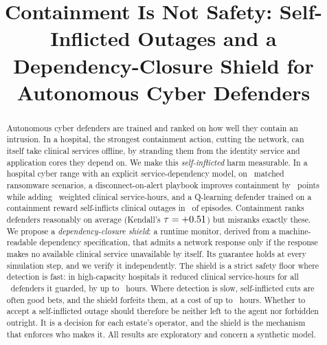 \documentclass[conference,compsoc]{IEEEtran}
\begin{document}
\title{Containment Is Not Safety: Self-Inflicted Outages and a\\
Dependency-Closure Shield for Autonomous Cyber Defenders}

\author{
}

\maketitle

\begin{abstract}
Autonomous cyber defenders are trained and ranked on how well they contain
an intrusion. In a hospital, the strongest containment action, cutting the
network, can itself take clinical services offline, by stranding them from
the identity service and application cores they depend on. We make this
\emph{self-inflicted} harm measurable. In a hospital cyber range with an
explicit service-dependency model, on \numEvalScenarios\ matched ransomware
scenarios, a disconnect-on-alert playbook improves containment by
\numVsDisconnectSpreadAbs\ points while adding \numVsDisconnectHoursAbs\
weighted clinical service-hours, and a Q-learning defender trained on a
containment reward self-inflicts clinical outages in
\numQContainmentTodaySelfPct\ of episodes. Containment ranks defenders
reasonably on average (Kendall's $\tau=+0.51$) but misranks exactly
these. We propose a \emph{dependency-closure shield}: a runtime monitor,
derived from a machine-readable dependency specification, that admits a
network response only if the response makes no available clinical service
unavailable by itself. Its guarantee holds at every simulation step, and
we verify it independently. The shield is a strict safety floor where
detection is fast: in high-capacity hospitals it reduced clinical
service-hours for all \numPosthocDefenders\ defenders it guarded, by up to
\numShieldDisconnectHighCapacityHoursAbs\ hours. Where detection is slow,
self-inflicted cuts are often good bets, and the shield forfeits them, at a
cost of up to \numShieldQContainmentReplicasResourceConstrainedHoursAbs\
hours. Whether to accept a self-inflicted outage should therefore be
neither left to the agent nor forbidden outright. It is a decision for each
estate's operator, and the shield is the mechanism that enforces who makes
it. All results are exploratory and concern a synthetic model.
\end{abstract}

\end{document}
